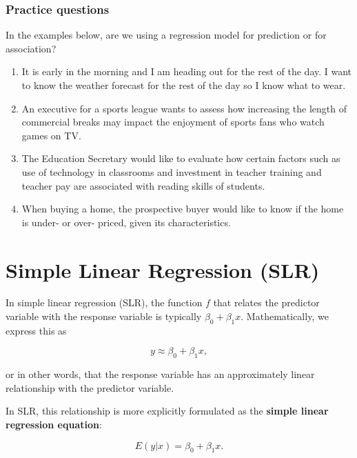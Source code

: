 \documentclass[
]{book}
\begin{document}
\hypertarget{practice-questions}{%
\subsubsection{Practice questions}\label{practice-questions}}

In the examples below, are we using a regression model for prediction or for association?

\begin{enumerate}
\def\labelenumi{\arabic{enumi}.}
\item
  It is early in the morning and I am heading out for the rest of the day. I want to know the weather forecast for the rest of the day so I know what to wear.
\item
  An executive for a sports league wants to assess how increasing the length of commercial breaks may impact the enjoyment of sports fans who watch games on TV.
\item
  The Education Secretary would like to evaluate how certain factors such as use of technology in classrooms and investment in teacher training and teacher pay are associated with reading skills of students.
\item
  When buying a home, the prospective buyer would like to know if the home is under- or over- priced, given its characteristics.
\end{enumerate}

\hypertarget{simple-linear-regression-slr}{%
\section{Simple Linear Regression (SLR)}\label{simple-linear-regression-slr}}

In simple linear regression (SLR), the function \(f\) that relates the predictor variable with the response variable is typically \(\beta_0 + \beta_1 x\). Mathematically, we express this as

\[
y \approx \beta_0 + \beta_1 x,
\]

or in other words, that the response variable has an approximately linear relationship with the predictor variable.

In SLR, this relationship is more explicitly formulated as the \textbf{simple linear regression equation}:

\begin{equation} 
E(y|x)=\beta_0+\beta_{1}x.
\label{eq:SLR}
\end{equation}
\end{document}
